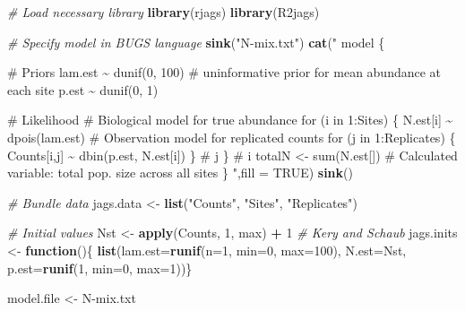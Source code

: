 \documentclass[
]{krantz}
\makeatletter
\newenvironment{Shaded}{\begin{snugshade}}{\end{snugshade}}
\newcommand{\AttributeTok}[1]{\textcolor[rgb]{0.27,0.27,0.27}{#1}}
\newcommand{\CommentTok}[1]{\textcolor[rgb]{0.37,0.37,0.37}{\textit{#1}}}
\newcommand{\ConstantTok}[1]{\textcolor[rgb]{0.37,0.37,0.37}{#1}}
\newcommand{\ControlFlowTok}[1]{\textcolor[rgb]{0.27,0.27,0.27}{\textbf{#1}}}
\newcommand{\DecValTok}[1]{\textcolor[rgb]{0.06,0.06,0.06}{#1}}
\newcommand{\FunctionTok}[1]{\textcolor[rgb]{0.27,0.27,0.27}{\textbf{#1}}}
\newcommand{\NormalTok}[1]{#1}
\newcommand{\OtherTok}[1]{\textcolor[rgb]{0.37,0.37,0.37}{#1}}
\newcommand{\SpecialCharTok}[1]{\textcolor[rgb]{0.43,0.43,0.43}{\textbf{#1}}}
\newcommand{\StringTok}[1]{\textcolor[rgb]{0.5,0.5,0.5}{#1}}
\newenvironment{kframe}{%
\medskip{}
\setlength{\fboxsep}{.8em}
 \def\at@end@of@kframe{}%
 \ifinner\ifhmode%
  \def\at@end@of@kframe{\end{minipage}}%
  \begin{minipage}{\columnwidth}%
 \fi\fi%
 \def\FrameCommand##1{\hskip\@totalleftmargin \hskip-\fboxsep
 \colorbox{shadecolor}{##1}\hskip-\fboxsep
     \hskip-\linewidth \hskip-\@totalleftmargin \hskip\columnwidth}%
 \MakeFramed {\advance\hsize-\width
   \@totalleftmargin\z@ \linewidth\hsize
   \@setminipage}}%
 {\par\unskip\endMakeFramed%
 \at@end@of@kframe}
\renewenvironment{Shaded}{\begin{kframe}}{\end{kframe}}
\makeatother
\begin{document}
\begin{Shaded}
\begin{Highlighting}[]
\CommentTok{\# Load necessary library}
\FunctionTok{library}\NormalTok{(rjags)}
\FunctionTok{library}\NormalTok{(R2jags)}

\CommentTok{\# Specify model in BUGS language}
\FunctionTok{sink}\NormalTok{(}\StringTok{"N{-}mix.txt"}\NormalTok{)}
\FunctionTok{cat}\NormalTok{(}\StringTok{"}
\StringTok{model \{}

\StringTok{\# Priors}
\StringTok{  lam.est \textasciitilde{} dunif(0, 100)  \# uninformative prior for mean abundance at each site}
\StringTok{  p.est \textasciitilde{} dunif(0, 1)}

\StringTok{\# Likelihood}
\StringTok{\# Biological model for true abundance}
\StringTok{for (i in 1:Sites) \{}
\StringTok{   N.est[i] \textasciitilde{} dpois(lam.est)}
\StringTok{   \# Observation model for replicated counts}
\StringTok{   for (j in 1:Replicates) \{}
\StringTok{      Counts[i,j] \textasciitilde{} dbin(p.est, N.est[i])}
\StringTok{      \} \# j}
\StringTok{   \} \# i}
\StringTok{totalN \textless{}{-} sum(N.est[])     \# Calculated variable: total pop. size across all sites}
\StringTok{\}}
\StringTok{"}\NormalTok{,}\AttributeTok{fill =} \ConstantTok{TRUE}\NormalTok{)}
\FunctionTok{sink}\NormalTok{()}

\CommentTok{\# Bundle data}
\NormalTok{jags.data }\OtherTok{\textless{}{-}} \FunctionTok{list}\NormalTok{(}\StringTok{"Counts"}\NormalTok{, }\StringTok{"Sites"}\NormalTok{, }\StringTok{"Replicates"}\NormalTok{)}

\CommentTok{\# Initial values}
\NormalTok{Nst }\OtherTok{\textless{}{-}} \FunctionTok{apply}\NormalTok{(Counts, }\DecValTok{1}\NormalTok{, max) }\SpecialCharTok{+} \DecValTok{1}    \CommentTok{\# Kery and Schaub}
\NormalTok{jags.inits }\OtherTok{\textless{}{-}} \ControlFlowTok{function}\NormalTok{()\{ }\FunctionTok{list}\NormalTok{(}\AttributeTok{lam.est=}\FunctionTok{runif}\NormalTok{(}\AttributeTok{n=}\DecValTok{1}\NormalTok{, }\AttributeTok{min=}\DecValTok{0}\NormalTok{, }\AttributeTok{max=}\DecValTok{100}\NormalTok{),}
                               \AttributeTok{N.est=}\NormalTok{Nst, }\AttributeTok{p.est=}\FunctionTok{runif}\NormalTok{(}\DecValTok{1}\NormalTok{, }\AttributeTok{min=}\DecValTok{0}\NormalTok{, }\AttributeTok{max=}\DecValTok{1}\NormalTok{))\}}

\NormalTok{model.file }\OtherTok{\textless{}{-}} \StringTok{\textquotesingle{}N{-}mix.txt\textquotesingle{}}


\end{Highlighting}
\end{Shaded}
\end{document}
